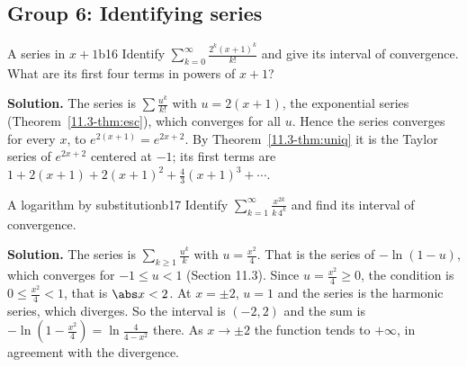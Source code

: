 \documentclass[11pt]{article}
\begin{document}
\subsection*{Group 6: Identifying series}

\begin{exmp}{A series in $x+1$}{b16}
Identify $\displaystyle\sum_{k=0}^\infty\frac{2^k(x+1)^k}{k!}$ and give its interval of convergence. What are its first four terms in powers of $x+1$?

\textbf{Solution.} The series is $\sum\frac{u^k}{k!}$ with $u=2(x+1)$, the exponential series (Theorem~\ref{11.3-thm:esc}), which converges for all $u$. Hence the series converges for every $x$, to $e^{2(x+1)}=e^{2x+2}$. By Theorem~\ref{11.3-thm:uniq} it is the Taylor series of $e^{2x+2}$ centered at $-1$; its first terms are $1+2(x+1)+2(x+1)^2+\frac43(x+1)^3+\cdots$.
\end{exmp}

\begin{exmp}{A logarithm by substitution}{b17}
Identify $\displaystyle\sum_{k=1}^\infty\frac{x^{2k}}{k\,4^k}$ and find its interval of convergence.

\textbf{Solution.} The series is $\sum_{k\ge1}\frac{u^k}k$ with $u=\frac{x^2}4$. That is the series of $-\ln(1-u)$, which converges for $-1\le u<1$ (Section 11.3). Since $u=\frac{x^2}4\ge0$, the condition is $0\le\frac{x^2}4<1$, that is $\abs x<2$. At $x=\pm2$, $u=1$ and the series is the harmonic series, which diverges. So the interval is $(-2,2)$ and the sum is $-\ln\left(1-\frac{x^2}4\right)=\ln\frac4{4-x^2}$ there. As $x\to\pm2$ the function tends to $+\infty$, in agreement with the divergence.
\end{exmp}
\end{document}
